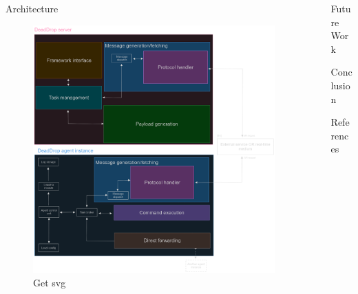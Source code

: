 \documentclass[final]{beamer}
\newlength{\sepwidth}
\newlength{\colwidth}
\newcommand{\separatorcolumn}{\begin{column}{\sepwidth}\end{column}}
\begin{document}
\begin{frame}[t]
\begin{columns}[t]
\begin{column}{\colwidth}
\begin{block}{Architecture}
    \begin{figure}
      \centering
      \includegraphics[width=\textwidth]{images/architecture.png}
      \caption{Get svg}
    \end{figure}

  \end{block}

\end{column}

\separatorcolumn

\begin{column}{\colwidth}

  \begin{block}{Future Work}


    \lipsum[1]


    \lipsum[1]

  \end{block}

  \begin{block}{Conclusion}

    \lipsum[1]

  \end{block}

  \begin{block}{References}
    \nocite{*}
    \footnotesize{}
  \end{block}
  

\end{column}
\end{columns}
\end{frame}
\end{document}
